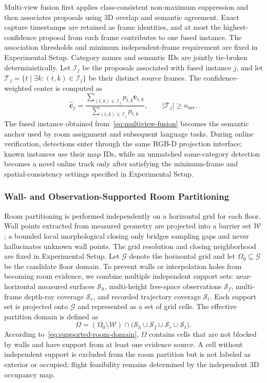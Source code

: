\documentclass[letterpaper,10pt,journal]{IEEEtran}
\begin{document}
Multi-view fusion first applies class-consistent non-maximum suppression and then associates proposals using 3D overlap and semantic agreement. Exact capture timestamps are retained as frame identities, and at most the highest-confidence proposal from each frame contributes to one fused instance. The association thresholds and minimum independent-frame requirement are fixed in Experimental Setup. Category names and semantic IDs are jointly tie-broken deterministically. Let $\mathcal I_j$ be the proposals associated with fused instance $j$, and let $\mathcal T_j=\{t\mid\exists k:(t,k)\in\mathcal I_j\}$ be their distinct source frames. The confidence-weighted center is computed as
\begin{equation}
\widehat{\mathbf{c}}_{j}=
\frac{\sum_{(t,k)\in\mathcal I_j}p_{t,k}\mathbf{c}_{t,k}}
     {\sum_{(t,k)\in\mathcal I_j}p_{t,k}},
\qquad
\lvert\mathcal T_j\rvert\geq n_{\mathrm{mv}}.
\label{eq:multiview-fusion}
\end{equation}
The fused instance obtained from~\eqref{eq:multiview-fusion} becomes the semantic anchor used by room assignment and subsequent language tasks. During online verification, detections enter through the same RGB-D projection interface; known instances use their map IDs, while an unmatched same-category detection becomes a novel online track only after satisfying the minimum-frame and spatial-consistency settings specified in Experimental Setup.

\subsubsection{Wall- and Observation-Supported Room Partitioning}

Room partitioning is performed independently on a horizontal grid for each floor. Wall points extracted from measured geometry are projected into a barrier set $\mathcal W$; a bounded local morphological closing only bridges sampling gaps and never hallucinates unknown wall points. The grid resolution and closing neighborhood are fixed in Experimental Setup. Let $\mathcal G$ denote the horizontal grid and let $\Omega_0\subseteq\mathcal G$ be the candidate floor domain. To prevent walls or interpolation holes from becoming room evidence, we combine multiple independent support sets: near-horizontal measured surfaces $\mathcal S_h$, multi-height free-space observations $\mathcal S_f$, multi-frame depth-ray coverage $\mathcal S_r$, and recorded trajectory coverage $\mathcal S_t$. Each support set is projected onto $\mathcal G$ and represented as a set of grid cells. The effective partition domain is defined as
\begin{equation}
\Omega=(\Omega_0\setminus\mathcal W)\cap
\bigl(\mathcal S_h\cup\mathcal S_f\cup\mathcal S_r\cup\mathcal S_t\bigr).
\label{eq:supported-room-domain}
\end{equation}
According to~\eqref{eq:supported-room-domain}, $\Omega$ contains cells that are not blocked by walls and have support from at least one evidence source. A cell without independent support is excluded from the room partition but is not labeled as exterior or occupied; flight feasibility remains determined by the independent 3D occupancy map.
\end{document}
